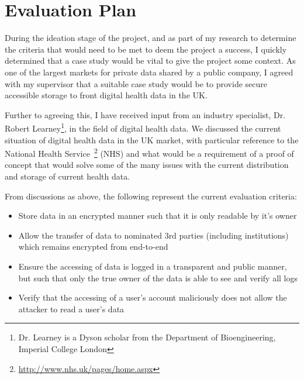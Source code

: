 \section{Evaluation Plan}

During the ideation stage of the project, and as part of my research to determine the criteria that would need to be met to deem the project a success, I quickly determined that a case study would be vital to give the project some context. As one of the largest markets for private data shared by a public company, I agreed with my supervisor that a suitable case study would be to provide secure accessible storage to front digital health data in the UK.

Further to agreeing this, I have received input from an industry specialist, Dr. Robert Learney\footnote{Dr. Learney is a Dyson scholar from the Department of Bioengineering, Imperial College London}, in the field of digital health data. We discussed the current situation of digital health data in the UK market, with particular reference to the National Health Service~\footnote{\url{http://www.nhs.uk/pages/home.aspx}} (NHS) and what would be a requirement of a proof of concept that would solve some of the many issues with the current distribution and storage of current health data.

From discussions as above, the following represent the current evaluation criteria:

\begin{itemize}
  \item{Store data in an encrypted manner such that it is only readable by it's owner}
  \item{Allow the transfer of data to nominated 3rd parties (including institutions) which remains encrypted from end-to-end}
  \item{Ensure the accessing of data is logged in a transparent and public manner, but such that only the true owner of the data is able to see and verify all logs}
  \item{Verify that the accessing of a user's account maliciously does not allow the attacker to read a user's data}
  
\end{itemize}


